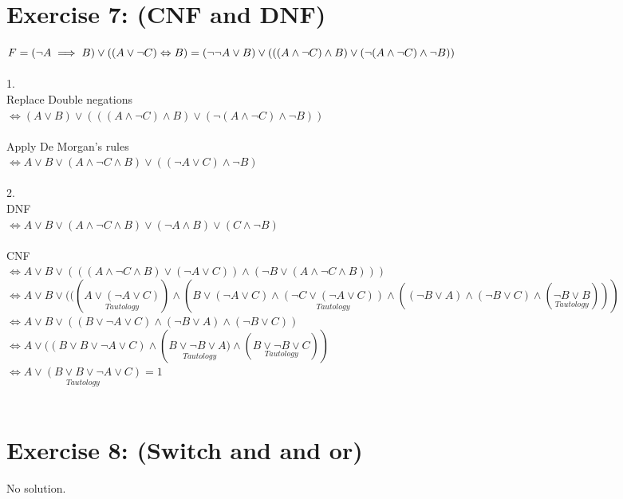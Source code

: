 \documentclass[12pt]{article}
\begin{document}
\section*{Exercise 7: (CNF and DNF)}
$ F = (\lnot A \implies B) \lor ((A \lor \lnot C) \Leftrightarrow B)\\
 = (\lnot\lnot A \lor B) \lor (((A \land \lnot C)\land B) \lor (\lnot(A\land \lnot C)\land \lnot B)) $\\ \\ 
1. \\
 Replace Double negations\\
 $\Leftrightarrow (A \lor B) \lor (((A \land \lnot C)\land B) \lor (\lnot(A\land \lnot C)\land \lnot B))$\\ \\
 Apply De Morgan's rules\\
 $\Leftrightarrow A \lor B \lor (A \land \lnot C \land B) \lor ((\lnot A \lor C) \land \lnot B)$\\ \\
2. \\
DNF\\
$\Leftrightarrow A \lor B \lor (A \land \lnot C \land B) \lor  (\lnot A \land B) \lor (C \land \lnot B)$ \\ \\
CNF\\
 $\Leftrightarrow A \lor B \lor 
 (((A \land \lnot C \land B) \lor (\lnot A \lor C)) \land (\lnot B \lor (A \land \lnot C \land B)))$\\
 $\Leftrightarrow A \lor B \lor 
 (((\underset{Tautology}{A \lor (\lnot A \lor C)}) \land (B \lor (\lnot A \lor C) \land \underset{Tautology}{(\lnot C \lor (\lnot A \lor C))} \land ((\lnot B \lor A) \land (\lnot B \lor C) \land (\underset{Tautology}{\lnot B \lor B})))$\\
 $\Leftrightarrow A \lor B \lor 
 ((B \lor \lnot A \lor C) \land (\lnot B \lor A) \land (\lnot B \lor C))$\\
$\Leftrightarrow A \lor ((B \lor B \lor \lnot A \lor C) \land (\underset{Tautology}{B \lor \lnot B \lor A)} \land (\underset{Tautology}{B \lor \lnot B \lor C}))$\\
$\Leftrightarrow \underset{Tautology}{A \lor (B \lor B \lor \lnot A \lor C)} = 1$\\ \\

\section*{Exercise 8: (Switch and and or)}
No solution.

\end{document}
